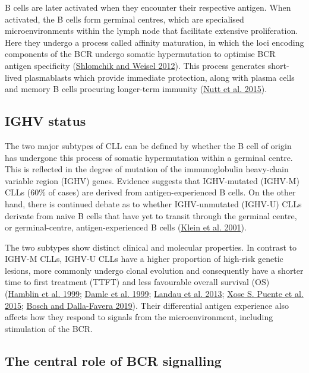 \documentclass[11pt, a4paper, twosided]{book}
\begin{document}
B cells are later activated when they encounter their respective antigen. When activated, the B cells form germinal centres, which are specialised microenvironments within the lymph node that facilitate extensive proliferation. Here they undergo a process called affinity maturation, in which the loci encoding components of the BCR undergo somatic hypermutation to optimise BCR antigen specificity (\protect\hyperlink{ref-Shlomchik2012}{Shlomchik and Weisel 2012}). This process generates short-lived plasmablasts which provide immediate protection, along with plasma cells and memory B cells procuring longer-term immunity (\protect\hyperlink{ref-Nutt2015}{Nutt et al. 2015}).

\hypertarget{intro-ighv-status}{%
\subsection{IGHV status}\label{intro-ighv-status}}

The two major subtypes of CLL can be defined by whether the B cell of origin has undergone this process of somatic hypermutation within a germinal centre. This is reflected in the degree of mutation of the immunoglobulin heavy-chain variable region (IGHV) genes. Evidence suggests that IGHV-mutated (IGHV-M) CLLs (60\% of cases) are derived from antigen-experienced B cells. On the other hand, there is continued debate as to whether IGHV-unmutated (IGHV-U) CLLs derivate from naive B cells that have yet to transit through the germinal centre, or germinal-centre, antigen-experienced B cells (\protect\hyperlink{ref-Klein2001}{Klein et al. 2001}).

The two subtypes show distinct clinical and molecular properties. In contrast to IGHV-M CLLs, IGHV-U CLLs have a higher proportion of high-risk genetic lesions, more commonly undergo clonal evolution and consequently have a shorter time to first treatment (TTFT) and less favourable overall survival (OS) (\protect\hyperlink{ref-Hamblin1999}{Hamblin et al. 1999}; \protect\hyperlink{ref-Damle1999}{Damle et al. 1999}; \protect\hyperlink{ref-Landau2013}{Landau et al. 2013}; \protect\hyperlink{ref-Puente2015}{Xose S. Puente et al. 2015}; \protect\hyperlink{ref-Bosch2019}{Bosch and Dalla-Favera 2019}). Their differential antigen experience also affects how they respond to signals from the microenvironment, including stimulation of the BCR.

\hypertarget{intro-bcr-signalling}{%
\subsection{The central role of BCR signalling}\label{intro-bcr-signalling}}
\end{document}

